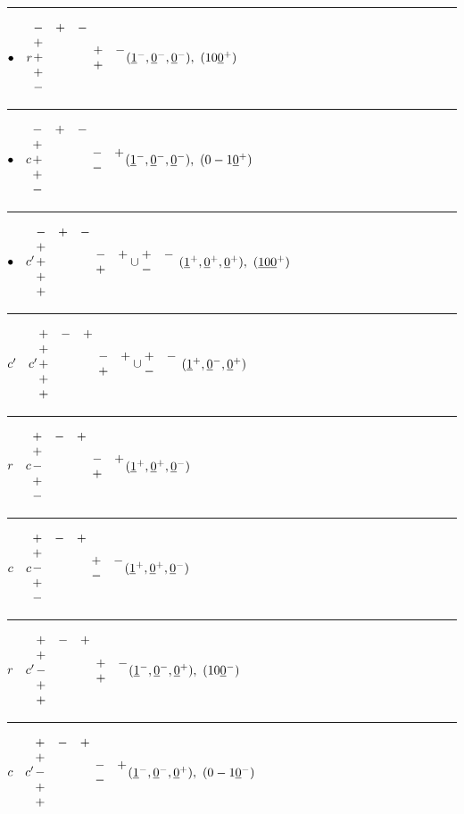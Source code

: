 \documentclass[11pt ,reqno]{amsart}
\begin{document}
\bigskip
\hrule
\medskip
$\begin{matrix} \bullet&r\end{matrix}$\qquad $\begin{matrix} -&+&-\\+&&\\+&&\\+&&\\-&&\end{matrix}$\qquad
\qquad $\begin{matrix}+&-\\+&\end{matrix}$\qquad $(\ul{1}^-,\ul{0}^-,\ul{0}^-),\ (10\ul{0}^+)$
\hfill
\medskip
\hrule
\medskip
$\begin{matrix} \bullet&c\end{matrix}$\qquad $\begin{matrix} -&+&-\\+&&\\+&&\\+&&\\-&&\end{matrix}$\qquad
\qquad $\begin{matrix}-&+\\-&\end{matrix}$\qquad $(\ul{1}^-,\ul{0}^-,\ul{0}^-),\ (0-1\ul{0}^+)$
\hfill
\medskip
\hrule
\medskip
$\begin{matrix} \bullet&c'\end{matrix}$\qquad $\begin{matrix} -&+&-\\+&&\\+&&\\+&&\\+&&\end{matrix}$\qquad
\qquad $\begin{matrix}-&+\\+&\end{matrix}\cup\begin{matrix}+&-\\-&\end{matrix} $
\qquad $(\ul{1}^+,\ul{0}^+,\ul{0}^+),\ (\ul{10}\ul{0}^+)$
\hfill
\medskip
\hrule
\medskip
$\begin{matrix} c'&c'\end{matrix}$\qquad $\begin{matrix} +&-&+\\+&&\\+&&\\+&&\\+&&\end{matrix}$\qquad
\qquad $\begin{matrix}-&+\\+&\end{matrix}\cup\begin{matrix}+&-\\-&\end{matrix} $
\qquad $({\underline{1}}^+,{\underline{0}}^-,{\underline{0}}^+)$
\hfill
\medskip
\hrule
\medskip
$\begin{matrix} r&c\end{matrix}$\qquad $\begin{matrix} +&-&+\\+&&\\-&&\\+&&\\-&&\end{matrix}$\qquad
\qquad $\begin{matrix}-&+\\+&\end{matrix}$\qquad $({\underline{1}}^+,{\underline{0}}^+,{\underline{0}}^-)$
\hfill
\medskip
\hrule
\medskip
$\begin{matrix} c&c\end{matrix}$\qquad $\begin{matrix} +&-&+\\+&&\\-&&\\+&&\\-&&\end{matrix}$\qquad
\qquad $\begin{matrix}+&-\\-&\end{matrix}$\qquad $({\underline{1}}^+,{\underline{0}}^+,{\underline{0}}^-)$
\hfill
\medskip
\hrule
\medskip
$\begin{matrix} r&c'\end{matrix}$\qquad $\begin{matrix} +&-&+\\+&&\\-&&\\+&&\\+&&\end{matrix}$\qquad
\qquad $\begin{matrix}+&-\\+&\end{matrix}$\qquad $(\ul{1}^-,\ul{0}^-,\ul{0}^+),\ (10\ul{0}^-)$
\hfill
\medskip
\hrule
\medskip
$\begin{matrix} c&c'\end{matrix}$\qquad $\begin{matrix} +&-&+\\+&&\\-&&\\+&&\\+&&\end{matrix}$\qquad
\qquad $\begin{matrix}-&+\\-&\end{matrix}$\qquad $(\ul{1}^-,\ul{0}^-,\ul{0}^+),\ (0-1\ul{0}^-)$
\end{document}
